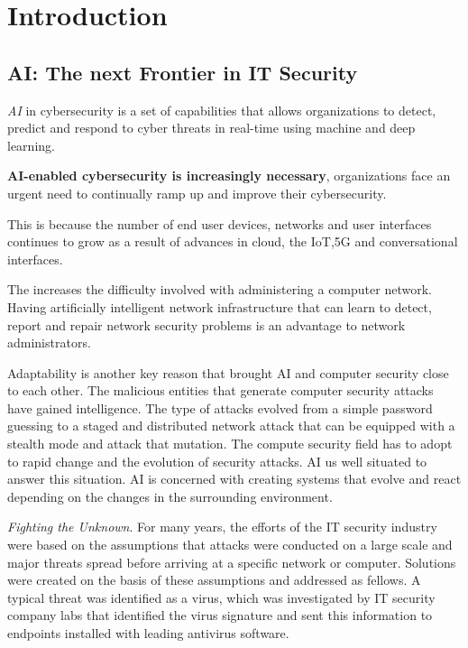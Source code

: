 
\chapter{Introduction} \label{ch-1}

\section{AI: The next Frontier in IT Security} 

\textit{AI} in cybersecurity is a set of capabilities that allows organizations to detect, predict and respond to cyber threats in real-time
using machine and deep learning.


\textbf{AI-enabled cybersecurity is increasingly necessary}, organizations face an urgent need to continually ramp up and improve their cybersecurity. 

This is because the number of end user devices, networks and user interfaces continues to grow as a result of advances in cloud, the IoT,5G and conversational interfaces.

The increases the difficulty involved with administering a computer network. Having artificially intelligent network infrastructure that can learn to detect,
report and repair network security problems is an advantage to network administrators. 

Adaptability is another key reason that brought AI and computer security close to each other. The malicious entities that generate computer security attacks have gained intelligence. 
The type of attacks evolved from a simple password guessing to a staged and distributed network attack that can be equipped with a stealth mode and attack that mutation.
The compute security field has to adopt to rapid change and the evolution of security attacks. AI us well situated to answer this situation. AI is concerned with creating systems that evolve
and react depending on the changes in the surrounding environment. 

\textit{Fighting the Unknown}. For many years, the efforts of the IT security industry were based on the assumptions 
that attacks were conducted on a large scale and major threats spread before arriving at a specific network or computer.
Solutions were created on the basis of these assumptions and addressed as fellows. A typical threat was identified as a virus, which was investigated 
by IT security company labs that identified the virus signature and sent this information to endpoints installed with leading antivirus software. 

